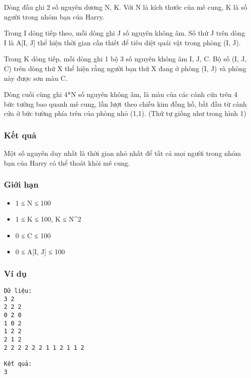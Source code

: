 Dòng đầu ghi 2 số nguyên dương N, K. Với N là kích thước của mê cung, K là số người trong nhóm bạn của Harry.

Trong I dòng tiếp theo, mỗi dòng ghi J số nguyên không âm. Số thứ J trên dòng I là A[I, J] thể hiện thời gian cần thiết để tiêu diệt quái vật trong phòng (I, J).

Trong K dòng tiếp, mỗi dòng ghi 1 bộ 3 số nguyên không âm I, J, C. Bộ số (I, J, C) trên dòng thứ X thể hiện rằng người bạn thứ X đang ở phòng (I, J) và phòng này được sơn màu C.

Dòng cuối cùng ghi 4*N số nguyên không âm, là màu của các cánh cửa trên 4 bức tường bao quanh mê cung, lần lượt theo chiều kim đồng hồ, bắt đầu từ cánh cửa ở bức tường phía trên của phòng nhỏ (1,1). (Thứ tự giống như trong hình 1)

\subsubsection{Kết quả}

Một số nguyên duy nhất là thời gian nhỏ nhất để tất cả mọi người trong nhóm bạn của Harry có thể thoát khỏi mê cung.

\subsubsection{Giới hạn}
\begin{itemize}
	\item 1 ≤ N ≤ 100
	\item 1 ≤ K ≤ 100, K ≤ N^2
	\item 0 ≤ C ≤ 100
	\item 0 ≤ A[I, J] ≤ 100
\end{itemize}

\subsubsection{Ví dụ}
\begin{verbatim}
Dữ liệu:
3 2
2 2 2
0 2 0
1 0 2
1 2 2
2 1 2
2 2 2 2 2 2 1 1 2 1 1 2

Kết quả:
3
\end{verbatim}

